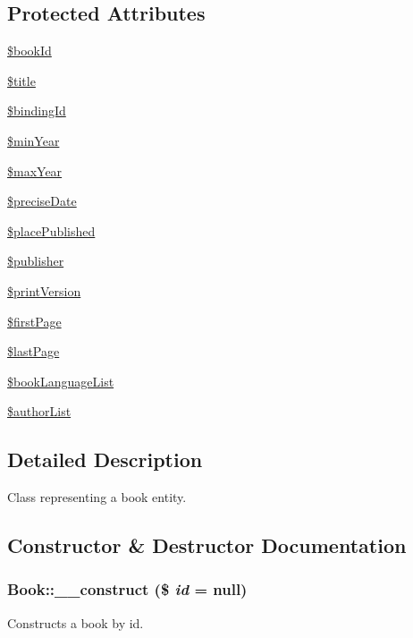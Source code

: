 \subsection*{Protected Attributes}
\begin{DoxyCompactItemize}
\item 
\hyperlink{classBook_a6ba400609a6bce5ffd6dd2cf4f52de89}{\$bookId}
\item 
\hyperlink{classBook_a4dbd5bfc30228cdd5fef4e2c9c2c1a5a}{\$title}
\item 
\hyperlink{classBook_a87186d8e5f7671f3735032047c9ab5ef}{\$bindingId}
\item 
\hyperlink{classBook_a7fd3b935f402594ad114dc3a91031e5d}{\$minYear}
\item 
\hyperlink{classBook_a9e0fb12f3337abe8773af3065a179340}{\$maxYear}
\item 
\hyperlink{classBook_ab52e10e77d272c21a60f4076452d21b3}{\$preciseDate}
\item 
\hyperlink{classBook_a1e821cbef3523d8a43e4a8ba93dd3e3c}{\$placePublished}
\item 
\hyperlink{classBook_afe1783a0dd9a9c2762afd950cbef2f23}{\$publisher}
\item 
\hyperlink{classBook_a9716a8f1fd9835afde5b49620ff7477c}{\$printVersion}
\item 
\hyperlink{classBook_a387848127a960472ad77a28e965eb688}{\$firstPage}
\item 
\hyperlink{classBook_a459f6ea8d3000089d048fad6c4bba961}{\$lastPage}
\item 
\hyperlink{classBook_a2c4309c16fe7bbc190a11815044334fa}{\$bookLanguageList}
\item 
\hyperlink{classBook_a805fd463f7a6a7c370bd0d8aa87917e3}{\$authorList}
\end{DoxyCompactItemize}


\subsection{Detailed Description}
Class representing a book entity. 

\subsection{Constructor \& Destructor Documentation}
\hypertarget{classBook_a6187e2b162dde2c970e8b33e0b8c57b8}{
\subsubsection[{\_\-\_\-construct}]{\setlength{\rightskip}{0pt plus 5cm}Book::\_\-\_\-construct (\$ {\em id} = {\ttfamily null})}}
\label{classBook_a6187e2b162dde2c970e8b33e0b8c57b8}
Constructs a book by id.


